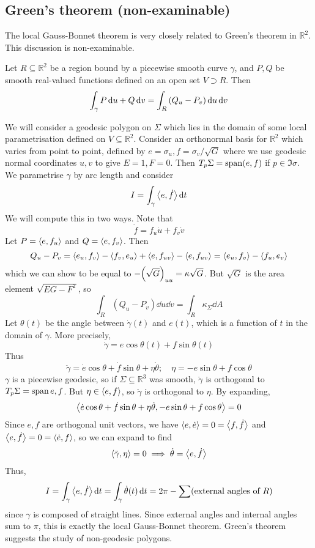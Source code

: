 \subsection{Green's theorem (non-examinable)}
The local Gauss-Bonnet theorem is very closely related to Green's theorem in \( \mathbb R^2 \).
This discussion is non-examinable.
\begin{theorem}
	Let \( R \subseteq \mathbb R^2 \) be a region bound by a piecewise smooth curve \( \gamma \), and \( P, Q \) be smooth real-valued functions defined on an open set \( V \supset R \).
	Then
	\[ \int_\gamma P \dd{u}+ Q \dd{v} = \int_R \qty(Q_u - P_v) \dd{u} \dd{v} \]
\end{theorem}
We will consider a geodesic polygon on \( \Sigma \) which lies in the domain of some local parametrisation defined on \( V \subseteq \mathbb R^2 \).
Consider an orthonormal basis for \( \mathbb R^2 \) which varies from point to point, defined by \( e = \sigma_u, f = \sigma_v/\sqrt{G} \) where we use geodesic normal coordinates \( u,v \) to give \( E = 1, F = 0 \).
Then \( T_p \Sigma = \operatorname{span}(e,f) \) if \( p \in \Im \sigma \).
We parametrise \( \gamma \) by arc length and consider
\[ I = \int_\gamma \left\langle{e,\dot f}\right\rangle \dd{t} \]
We will compute this in two ways.
Note that
\[ \dot f = f_u \dot u + f_v \dot v \]
Let \( P = \left\langle{e,f_u}\right\rangle \) and \( Q = \left\langle{e,f_v}\right\rangle \).
Then
\[ Q_u - P_v = \left\langle{e_u, f_v}\right\rangle - \left\langle{f_v, e_u}\right\rangle + \left\langle{e, f_{uv}}\right\rangle - \left\langle{e, f_{uv}}\right\rangle = \left\langle{e_u, f_v}\right\rangle - \left\langle{f_u, e_v}\right\rangle \]
which we can show to be equal to \( -\qty(\sqrt{G})_{uu} = \kappa \sqrt{G} \).
But \( \sqrt{G} \) is the area element \( \sqrt{EG-F^2} \), so
\[ \int_R (Q_u - P_v) \dd{u} \dd{v} = \int_R \kappa_\Sigma \dd{A} \]
Let \( \theta(t) \) be the angle between \( \dot\gamma(t) \) and \( e(t) \), which is a function of \( t \) in the domain of \( \gamma \).
More precisely,
\[ \dot \gamma = e \cos \theta(t) + f \sin \theta(t) \]
Thus
\[ \ddot \gamma = \dot e \cos \theta + \dot f \sin \theta + \eta \dot \theta;\quad \eta = -e\sin \theta + f \cos \theta \]
\( \gamma \) is a piecewise geodesic, so if \( \Sigma \subseteq \mathbb R^3 \) was smooth, \( \ddot \gamma \) is orthogonal to \( T_p \Sigma = \operatorname{span}{e,f} \).
But \( \eta \in \langle{} e,f \rangle \), so \( \ddot \gamma \) is orthogonal to \( \eta \).
By expanding,
\[ \left\langle{\dot e \cos \theta + \dot f \sin \theta + \eta \dot \theta, -e\sin\theta + f\cos \theta}\right\rangle = 0\]
Since \( e, f \) are orthogonal unit vectors, we have \( \left\langle{e,\dot e}\right\rangle = 0 = \left\langle{f,\dot f}\right\rangle \) and \( \left\langle{e,\dot f}\right\rangle = 0 = \left\langle{\dot e, f}\right\rangle \), so we can expand to find
\[ \left\langle{\ddot \gamma,\eta}\right\rangle = 0 \implies \dot \theta = \left\langle{e,\dot f}\right\rangle \]
Thus,
\[ I = \int_\gamma \left\langle{e,\dot f}\right\rangle \dd{t} = \int_\gamma \dot \theta(t) \dd{t} = 2\pi - \sum(\text{external angles of } R) \]
since \( \gamma \) is composed of straight lines.
Since external angles and internal angles sum to \( \pi \), this is exactly the local Gauss-Bonnet theorem.
Green's theorem suggests the study of non-geodesic polygons.

